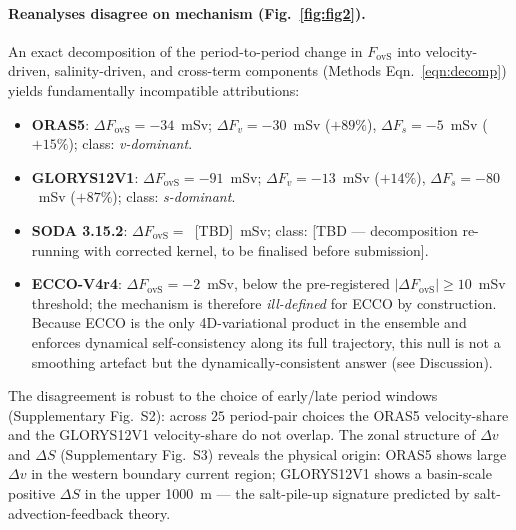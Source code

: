 \documentclass[12pt,a4paper]{article}
\newcommand{\Fovs}{F_\mathrm{ovS}}
\newcommand{\dFv}{\Delta F_v}
\newcommand{\dFs}{\Delta F_s}
\begin{document}
\paragraph{Reanalyses disagree on mechanism (Fig.~\ref{fig:fig2}).}
An exact decomposition of the period-to-period change in $\Fovs$ into
velocity-driven, salinity-driven, and cross-term components
(Methods Eqn.~\ref{eqn:decomp}) yields fundamentally incompatible
attributions:
\begin{itemize}
\item \textbf{ORAS5}: $\Delta\Fovs = -34$~mSv; $\dFv = -30$~mSv
      (${+89\%}$), $\dFs = -5$~mSv (${+15\%}$); class:
      \emph{v-dominant}.
\item \textbf{GLORYS12V1}: $\Delta\Fovs = -91$~mSv; $\dFv = -13$~mSv
      (${+14\%}$), $\dFs = -80$~mSv (${+87\%}$); class:
      \emph{s-dominant}.
\item \textbf{SODA 3.15.2}: $\Delta\Fovs = $~[TBD]~mSv; class:
      [TBD --- decomposition re-running with corrected kernel, to
      be finalised before submission].
\item \textbf{ECCO-V4r4}: $\Delta\Fovs = -2$~mSv, below the
      pre-registered $|\Delta\Fovs| \ge 10$~mSv threshold; the
      mechanism is therefore \emph{ill-defined} for ECCO by
      construction. Because ECCO is the only 4D-variational product
      in the ensemble and enforces dynamical self-consistency along
      its full trajectory, this null is not a smoothing artefact
      but the dynamically-consistent answer (see Discussion).
\end{itemize}
The disagreement is robust to the choice of early/late period windows
(Supplementary Fig.~S2): across $25$ period-pair choices the ORAS5
velocity-share and the GLORYS12V1 velocity-share do not overlap. The zonal
structure of $\Delta v$ and $\Delta S$ (Supplementary Fig.~S3) reveals
the physical origin: ORAS5 shows large $\Delta v$ in the western
boundary current region; GLORYS12V1 shows a basin-scale positive
$\Delta S$ in the upper 1000~m --- the salt-pile-up signature predicted
by salt-advection-feedback theory.
\end{document}
